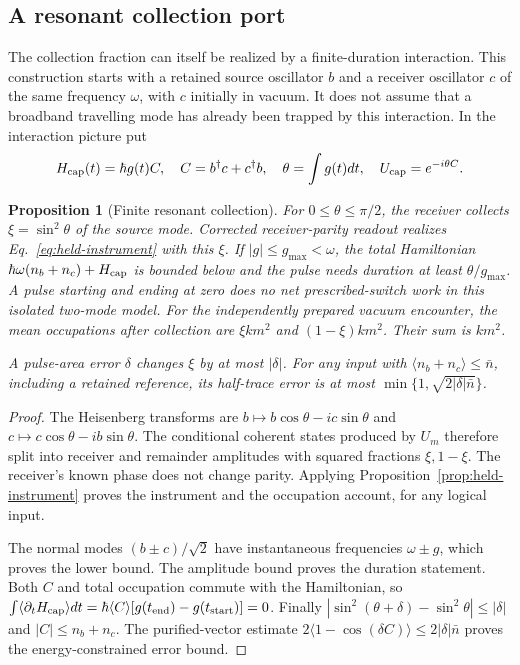 \documentclass[aps,pre,onecolumn,superscriptaddress,floatfix,longbibliography]{revtex4-2}
\newtheorem{proposition}[theorem]{Proposition}
\begin{document}
\subsection{A resonant collection port}
\label{sec:resonant-collector}

The collection fraction can itself be realized by a finite-duration interaction.
This construction starts with a retained source oscillator $b$ and a receiver
oscillator $c$ of the same frequency $\omega$, with $c$ initially in vacuum.
It does not assume that a broadband travelling mode has already been trapped
by this interaction. In the interaction picture put
\[
 H_{\rm cap}(t)=\hbar g(t)C,\quad
 C=b^\dagger c+c^\dagger b,\quad
 \theta=\int g(t)dt,\quad
 U_{\rm cap}=e^{-i\theta C}.
\]

\begin{proposition}[Finite resonant collection]
\label{prop:resonant-collection}
For $0\le\theta\le\pi/2$, the receiver collects
$\xi=\sin^2\theta$ of the source mode. Corrected receiver-parity readout
realizes Eq.~\eqref{eq:held-instrument} with this $\xi$.
If $|g|\le g_{\max}<\omega$, the total Hamiltonian
$\hbar\omega(n_b+n_c)+H_{\rm cap}$ is bounded below and the pulse needs
duration at least $\theta/g_{\max}$. A pulse starting and ending at zero
does no net prescribed-switch work in this isolated two-mode model.
For the independently prepared vacuum encounter, the mean occupations after
collection are $\xi km^2$ and $(1-\xi)km^2$. Their sum is $km^2$.

A pulse-area error $\delta$ changes $\xi$ by at most $|\delta|$.
For any input with $\langle n_b+n_c\rangle\le\bar n$, including a
retained reference, its half-trace error is at most
$\min\{1,\sqrt{2|\delta|\bar n}\}$.
\end{proposition}
\begin{proof}
The Heisenberg transforms are
$b\mapsto b\cos\theta-ic\sin\theta$ and
$c\mapsto c\cos\theta-ib\sin\theta$.
The conditional coherent states produced by $U_m$ therefore split into
receiver and remainder amplitudes with squared fractions $\xi,1-\xi$.
The receiver's known phase does not change parity. Applying
Proposition~\ref{prop:held-instrument} proves the instrument and the
occupation account, for any logical input.

The normal modes $(b\pm c)/\sqrt2$ have instantaneous frequencies
$\omega\pm g$, which proves the lower bound. The amplitude bound proves
the duration statement. Both $C$ and total occupation commute with the
Hamiltonian, so
$\int\langle\partial_tH_{\rm cap}\rangle dt
=\hbar\langle C\rangle[g(t_{\rm end})-g(t_{\rm start})]=0$.
Finally $|\sin^2(\theta+\delta)-\sin^2\theta|\le|\delta|$ and
$|C|\le n_b+n_c$. The purified-vector estimate
$2\langle1-\cos(\delta C)\rangle\le2|\delta|\bar n$ proves
the energy-constrained error bound.
\end{proof}
\end{document}
